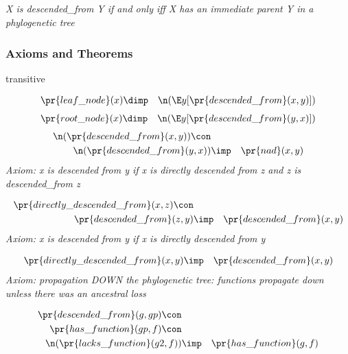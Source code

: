 \subsection*{ }
\emph{X is descended\_from Y if and only iff X has an immediate parent Y in a phylogenetic tree}

\subsubsection*{Axioms and Theorems}
\begin{clist}
\item transitive
\end{clist}

\begin{eqnarray*}
 \pr{leaf\_node}(x) &\dimp & \n( \E y[ \pr{descended\_from}(x, y) ])
\end{eqnarray*}
\begin{eqnarray*}
 \pr{root\_node}(x) &\dimp & \n( \E y[ \pr{descended\_from}(y, x) ])
\end{eqnarray*}
\begin{eqnarray*}
 \n( \pr{descended\_from}(x, y) )\con \\
 \n( \pr{descended\_from}(y, x) )&\imp & \pr{nad}(x, y) 
\end{eqnarray*}
\emph{Axiom: x is descended from y if x is directly descended from z and z is descended\_from z}

\begin{eqnarray*}
 \pr{directly\_descended\_from}(x, z) \con \\
 \pr{descended\_from}(z, y) &\imp & \pr{descended\_from}(x, y) 
\end{eqnarray*}
\emph{Axiom: x is descended from y if x is directly descended from y}

\begin{eqnarray*}
 \pr{directly\_descended\_from}(x, y) &\imp & \pr{descended\_from}(x, y) 
\end{eqnarray*}
\emph{Axiom: propagation DOWN the phylogenetic tree: functions propagate down unless there was an ancestral loss}

\begin{eqnarray*}
 \pr{descended\_from}(g, gp) \con \\
 \pr{has\_function}(gp, f) \con \\
 \n( \pr{lacks\_function}(g2, f) )&\imp & \pr{has\_function}(g, f) 
\end{eqnarray*}
\subsection*{ }
